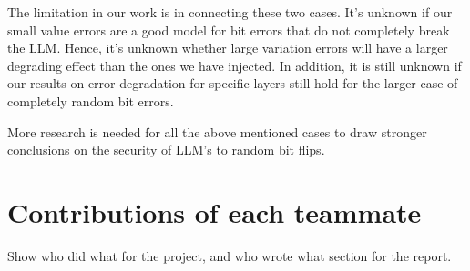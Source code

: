The limitation in our work is in connecting these two cases. It's unknown if our small value errors are a good model for bit errors that do not completely break the LLM. Hence, it's unknown whether
large variation errors will have a larger degrading effect than the ones we have injected. In addition, it is still unknown if our results on error degradation for specific layers still hold for
the larger case of completely random bit errors.

More research is needed for all the above mentioned cases to draw stronger conclusions on the security of LLM's to random bit flips.

\section{Contributions of each teammate}
Show who did what for the project, and who wrote what section for the report. 



